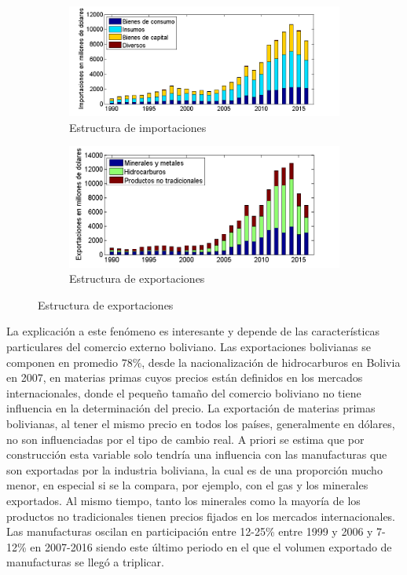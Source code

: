 \documentclass[12pt,letterpaper]{article}
\begin{document}
\begin{figure}
\centering
\caption{Estructura de importaciones y exportaciones de Bolivia}\label{impexp}
    \begin{subfigure}[b]{0.75\textwidth}
        \includegraphics[width=\textwidth]{imp9016}
        \caption{Estructura de importaciones}
        \label{mestr}
    \end{subfigure}
    \begin{subfigure}[b]{0.75\textwidth}
        \includegraphics[width=\textwidth]{exp9016}
        \caption{Estructura de exportaciones}
        \label{xestr}
    \end{subfigure}
\end{figure}

La explicación a este fenómeno es interesante y depende de las características particulares del comercio externo boliviano. Las exportaciones bolivianas se componen en promedio 78\%, desde la nacionalización de hidrocarburos en Bolivia en 2007, en materias primas cuyos precios están definidos en los mercados internacionales, donde el pequeño tamaño del comercio boliviano no tiene influencia en la determinación del precio. La exportación de materias primas bolivianas, al tener el mismo precio en todos los países, generalmente en dólares, no son influenciadas por el tipo de cambio real. A priori se estima que por construcción esta variable solo tendría una influencia con las manufacturas que son exportadas por la industria boliviana, la cual es de una proporción mucho menor, en especial si se la compara, por ejemplo, con el gas y los minerales exportados. Al mismo tiempo, tanto los minerales como la mayoría de los productos no tradicionales tienen precios fijados en los mercados internacionales. Las manufacturas oscilan en participación entre 12-25\% entre 1999 y 2006 y 7-12\% en 2007-2016 siendo este último periodo en el que el volumen exportado de manufacturas se llegó a triplicar. 
\end{document}
